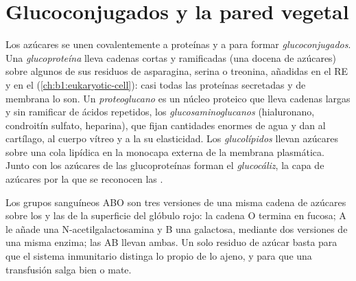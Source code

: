 \section{Glucoconjugados y la pared vegetal}

\begin{definition}\label{def:b1:carbohydrates:glycoconjugate}
Los azúcares se unen covalentemente a proteínas y a  para formar
\emph{glucoconjugados}. Una
\emph{glucoproteína} lleva cadenas cortas y ramificadas
(una docena de azúcares) sobre algunos de sus residuos de asparagina, serina
o treonina, añadidas en el RE y en el 
(\cref{ch:b1:eukaryotic-cell}): casi todas las proteínas secretadas y de
membrana lo son. Un \emph{proteoglucano} es un núcleo
proteico que lleva cadenas largas y sin ramificar de  ácidos
repetidos, los \emph{glucosaminoglucanos}
(hialuronano, condroitín sulfato, heparina), que fijan cantidades enormes de
agua y dan al cartílago, al cuerpo vítreo y a la  su
elasticidad. Los \emph{glucolípidos} llevan azúcares
sobre una cola lipídica en la monocapa externa de la membrana plasmática.
Junto con los azúcares de las glucoproteínas forman el
\emph{glucocáliz}, la capa de azúcares por la que se
reconocen las .
\end{definition}

\begin{example}\label{ex:b1:carbohydrates:abo}
Los grupos sanguíneos ABO son tres versiones de una misma cadena de azúcares
sobre los  y las  de la superficie del glóbulo
rojo: la cadena O termina en fucosa; A le añade una N-acetilgalactosamina y
B una galactosa, mediante dos versiones de una misma enzima; las  AB
llevan ambas. Un solo residuo de azúcar basta para que el sistema
inmunitario distinga lo propio de lo ajeno, y para que una transfusión salga
bien o mate.
\end{example}


